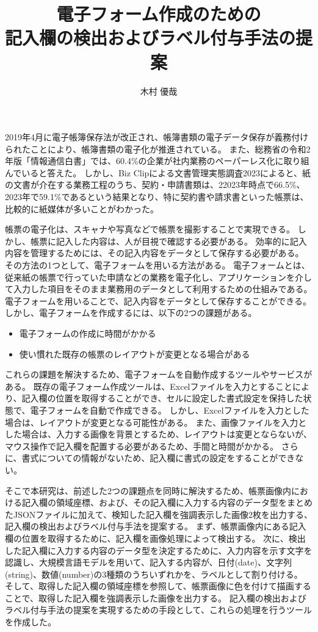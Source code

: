 \documentclass[uplatex, report, a4j, 10pt]{jsbook}
\title{電子フォーム作成のための\\記入欄の検出およびラベル付与手法の提案\\}
\author{木村 優哉}
\begin{document}
\maketitle


%
%

2019年4月に電子帳簿保存法が改正され、帳簿書類の電子データ保存が義務付けられたことにより、帳簿書類の電子化が推進されている。
また、総務省の令和2年版「情報通信白書」では、60.4\%の企業が社内業務のペーパーレス化に取り組んでいると答えた。
しかし、Biz Clipによる文書管理実態調査2023によると、紙の文書が介在する業務工程のうち、契約・申請書類は、22023年時点で66.5\%、2023年で59.1\%であるという結果となり、特に契約書や請求書といった帳票は、比較的に紙媒体が多いことがわかった。

帳票の電子化は、スキャナや写真などで帳票を撮影することで実現できる。
しかし、帳票に記入した内容は、人が目視で確認する必要がある。
効率的に記入内容を管理するためには、その記入内容をデータとして保存する必要がある。
その方法の1つとして、電子フォームを用いる方法がある。
電子フォームとは、従来紙の帳票で行っていた申請などの業務を電子化し、アプリケーションを介して入力した項目をそのまま業務用のデータとして利用するための仕組みである。
電子フォームを用いることで、記入内容をデータとして保存することができる。
しかし、電子フォームを作成するには、以下の2つの課題がある。

\begin{itemize}
  \item 電子フォームの作成に時間がかかる
  \item 使い慣れた既存の帳票のレイアウトが変更となる場合がある
\end{itemize}

これらの課題を解決するため、電子フォームを自動作成するツールやサービスがある。
既存の電子フォーム作成ツールは、Excelファイルを入力とすることにより、記入欄の位置を取得することができ、セルに設定した書式設定を保持した状態で、電子フォームを自動で作成できる。
しかし、Excelファイルを入力とした場合は、レイアウトが変更となる可能性がある。
また、画像ファイルを入力とした場合は、入力する画像を背景とするため、レイアウトは変更とならないが、マウス操作で記入欄を配置する必要があるため、手間と時間がかかる。
さらに、書式についての情報がないため、記入欄に書式の設定をすることができない。

そこで本研究は、前述した2つの課題点を同時に解決するため、帳票画像内における記入欄の領域座標、および、その記入欄に入力する内容のデータ型をまとめたJSONファイルに加えて、検知した記入欄を強調表示した画像2枚を出力する、記入欄の検出およびラベル付与手法を提案する。
まず、帳票画像内にある記入欄の位置を取得するために、記入欄を画像処理によって検出する。
次に、検出した記入欄に入力する内容のデータ型を決定するために、入力内容を示す文字を認識し、大規模言語モデルを用いて、記入する内容が、日付(date)、文字列(string)、数値(number)の3種類のうちいずれかを、ラベルとして割り付ける。
そして、取得した記入欄の領域座標を参照して、帳票画像に色を付けて描画することで、取得した記入欄を強調表示した画像を出力する。
記入欄の検出およびラベル付与手法の提案を実現するための手段として、これらの処理を行うツールを作成した。
\end{document}
